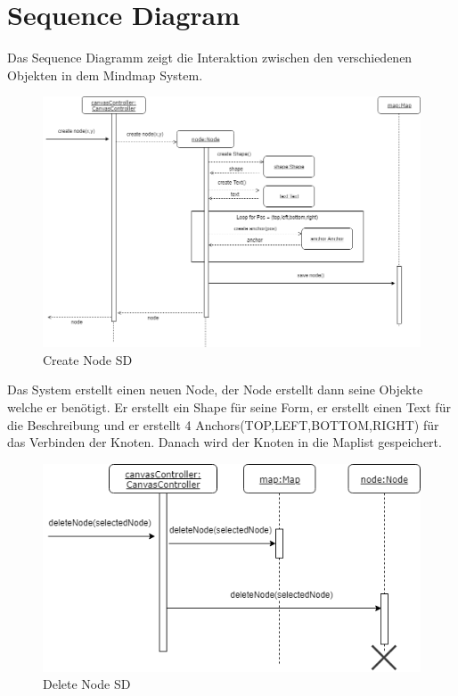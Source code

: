 \section{Sequence Diagram}
\label{sec:sequence_diagram}
Das Sequence Diagramm zeigt die Interaktion zwischen den verschiedenen Objekten in dem Mindmap System.
\begin{figure}[H]
	\centering
		\includegraphics[width=\textwidth]{images/crNodeSD.PNG}
	\caption{Create Node SD}
	\label{fig:create_node_SD}
\end{figure}

Das System erstellt einen neuen Node, der Node erstellt dann seine Objekte welche er benötigt.
Er erstellt ein Shape für seine Form, er erstellt einen Text für die Beschreibung und er erstellt
4 Anchors(TOP,LEFT,BOTTOM,RIGHT) für das Verbinden der Knoten. Danach wird der Knoten in die Maplist 
gespeichert.

\begin{figure}[H]
	\centering
		\includegraphics[scale=0.6]{images/delNodeSD.PNG}
	\caption{Delete Node SD}
	\label{fig:delete_node_SD}
\end{figure}

